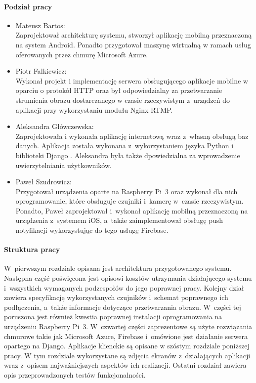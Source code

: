 \paragraph{Podział pracy}
\begin{itemize}
\item Mateusz Bartos: \\
Zaprojektował architekturę systemu, stworzył aplikację mobilną przeznaczoną na system Android. Ponadto przygotował maszynę wirtualną w ramach usług oferowanych przez chmurę Microsoft Azure.
\item Piotr Falkiewicz: \\
Wykonał projekt i implementację serwera obsługującego aplikacje mobilne w oparciu o protokół HTTP oraz był odpowiedzialny za przetwarzanie strumienia obrazu dostarczanego w czasie rzeczywistym z~urządzeń do aplikacji przy wykorzystaniu modułu Nginx RTMP.
\item Aleksandra Główczewska: \\
Zaprojektowała i wykonała aplikację internetową wraz z~własną obsługą baz danych. Aplikacja została wykonana z~wykorzystaniem języka Python i biblioteki Django \cite{djangoREST}. Aleksandra była także dpowiedzialna za wprowadzenie uwierzytelniania użytkowników.
\item Paweł Szudrowicz: \\
Przygotował urządzenia oparte na Raspberry Pi~3 oraz wykonał dla nich oprogramowanie, które obsługuje czujniki i~kamerę w~czasie rzeczywistym. Ponadto, Paweł zaprojektował i~wykonał aplikację mobilną przeznaczoną na urządzenia z~systemem iOS, a~także zaimplementował obsługę push notyfikacji wykorzystując do tego usługę Firebase.
\end{itemize}

\paragraph{Struktura pracy}
W~pierwszym rozdziale opisana jest architektura przygotowanego systemu. Następna część poświęcona jest opisowi kosztów utrzymania działającego systemu i~wszystkich wymaganych podzespołów do jego poprawnej pracy. Kolejny dział zawiera specyfikację wykorzystanych czujników i~schemat poprawnego ich podłączenia, a~także informacje dotyczące przetwarzania obrazu. W~części tej poruszona jest również kwestia poprawnej instalacji oprogramowania na urządzeniu Raspberry Pi~3.  W~czwartej części zaprezentowe są użyte rozwiązania chmurowe takie jak Microsoft Azure, Firebase i~omówione jest działanie serwera opartego na Django. Aplikacje klienckie są opisane w szóstym rozdziale poniższej pracy. W tym rozdziale wykorzystane są zdjęcia ekranów z~działających aplikacji wraz z~opisem najważniejszych aspektów ich realizacji. Ostatni rozdział zawiera opis przeprowadzonych testów funkcjonalności.
